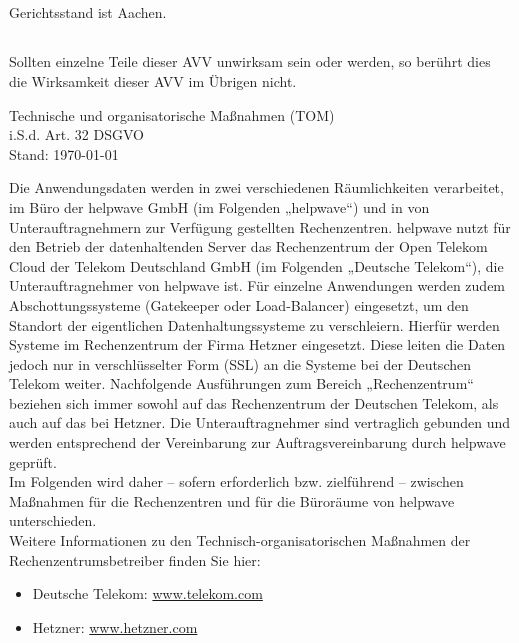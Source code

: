 \documentclass[10pt]{article}
\begin{document}
\subsection{} Gerichtsstand ist Aachen.
\subsection{} Sollten einzelne Teile dieser AVV unwirksam sein oder werden, so berührt dies die
Wirksamkeit dieser AVV im Übrigen nicht.

\newpage
\appendix

\begin{center}
	\Huge Technische und organisatorische Maßnahmen (TOM) \\
	\Large i.S.d. Art. 32 DSGVO \\
	\small Stand: \today
\end{center}

Die Anwendungsdaten werden in zwei verschiedenen Räumlichkeiten verarbeitet, im Büro
der helpwave GmbH (im Folgenden „helpwave“) und in von Unterauftragnehmern
zur Verfügung gestellten Rechenzentren. helpwave nutzt für den Betrieb der datenhaltenden
Server das Rechenzentrum der Open Telekom Cloud der Telekom Deutschland GmbH (im
Folgenden „Deutsche Telekom“), die Unterauftragnehmer von helpwave ist. Für einzelne
Anwendungen werden zudem Abschottungssysteme (Gatekeeper oder Load-Balancer)
eingesetzt, um den Standort der eigentlichen Datenhaltungssysteme zu verschleiern. Hierfür
werden Systeme im Rechenzentrum der Firma Hetzner eingesetzt. Diese leiten die Daten
jedoch nur in verschlüsselter Form (SSL) an die Systeme bei der Deutschen Telekom weiter.
Nachfolgende Ausführungen zum Bereich „Rechenzentrum“ beziehen sich immer sowohl auf
das Rechenzentrum der Deutschen Telekom, als auch auf das bei Hetzner. Die
Unterauftragnehmer sind vertraglich gebunden und werden entsprechend der Vereinbarung
zur Auftragsvereinbarung durch helpwave geprüft.
\\

Im Folgenden wird daher – sofern erforderlich bzw. zielführend – zwischen Maßnahmen für
die Rechenzentren und für die Büroräume von helpwave unterschieden.
\\

Weitere Informationen zu den Technisch-organisatorischen Maßnahmen der
Rechenzentrumsbetreiber finden Sie hier: \\
\begin{itemize}
	\item Deutsche Telekom: \href{https://www.telekom.com/resource/blob/532978/d65e16421b37487e249f0ce4980117ad/dl-tom-1-data.pdf}{www.telekom.com} \\
	\item Hetzner: \href{https://www.hetzner.com/AV/TOM.pdf}{www.hetzner.com}\\
\end{itemize}
\end{document}
